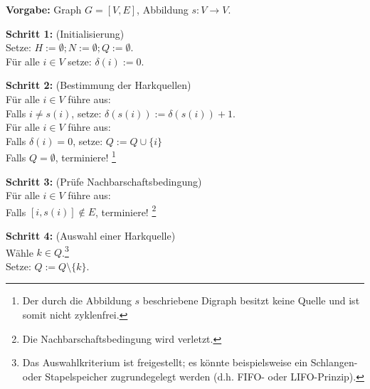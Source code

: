 \newpage
\begin{algo} \label{Algo_Prüfung_Nachfolgerfunktion}
\textbf{Vorgabe:} Graph $G=[V,E]$, Abbildung $s:V \rightarrow V$.

\noindent 
\textbf{Schritt 1:} (Initialisierung)\\
\phantom \quad Setze: $H := \emptyset; N := \emptyset; Q := \emptyset$. \\
\phantom \quad Für alle $i \in V$ setze: $\delta(i):=0.$

\noindent 
\textbf{Schritt 2:} (Bestimmung der Harkquellen)\\
\phantom \quad Für alle $i \in V$ führe aus:\\
\phantom \quad \qquad Falls $i \neq s(i)$, setze: $\delta(s(i)):=\delta(s(i))+1$.\\
\phantom \quad Für alle $i \in V$ führe aus:\\
\phantom \quad \qquad Falls $\delta(i)=0$, setze: $Q := Q \cup \{i\}$\\
\phantom \quad Falls $Q=\emptyset$, terminiere! \footnote{Der durch die Abbildung $s$ beschriebene Digraph besitzt keine Quelle und ist somit nicht zyklenfrei.}

\noindent 
\textbf{Schritt 3:} (Prüfe Nachbarschaftsbedingung)\\
\phantom \quad Für alle $i \in V$ führe aus:\\
\phantom \quad \qquad Falls $[i,s(i)] \notin E$, terminiere! \footnote{Die Nachbarschaftsbedingung wird verletzt.}

\noindent 
\textbf{Schritt 4:} (Auswahl einer Harkquelle)\\
\phantom \quad Wähle $k \in Q$.\footnote{Das Auswahlkriterium ist freigestellt; es könnte beispielsweise ein Schlangen- oder Stapelspeicher zugrundegelegt werden (d.h. FIFO- oder LIFO-Prinzip).}\\
\phantom \quad Setze: $Q := Q\setminus \{k\}$.


\end{algo}
